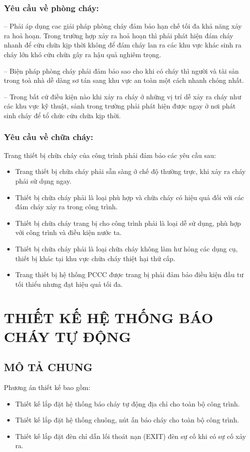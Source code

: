\subsubsection{Yêu cầu về phòng cháy:}
-- Phải áp dụng cac giải pháp phòng cháy đảm bảo hạn chế tối đa khả năng xảy ra hoả hoạn. Trong trường hợp xảy ra hoả hoạn thì phải phát hiện đám cháy nhanh để cứu chữa kịp thời không để đám cháy lan ra các khu vực khác sinh ra cháy lớn khó cứu chữa gây ra hậu quả nghiêm trọng.

-- Biện pháp phòng cháy phải đảm bảo sao cho khi có cháy thì người và tài sản trong toà nhà dễ dàng sơ tán sang khu vực an toàn một cách nhanh chóng nhất.

-- Trong bất cứ điều kiện nào khi xảy ra cháy ở những vị trí dễ xảy ra cháy như các khu vực kỹ thuật, sảnh trong trường phải phát hiện được ngay ở nơi phát sinh cháy để tổ chức cứu chữa kịp thời.
\subsubsection{Yêu cầu về chữa cháy:}
Trang thiết bị chữa cháy của công trình phải đảm bảo các yêu cầu sau:
\begin{itemize}
	\item Trang thiết bị chữa cháy phải sẵn sàng ở chế độ thường trực, khi xảy ra cháy phải sử dụng ngay.
	\item Thiết bị chữa cháy phải là loại phù hợp và chữa cháy có hiệu quả đối với các đám cháy xảy ra trong công trình.
	\item Thiết bị chữa cháy trang bị cho công trình phải là loại dễ sử dụng, phù hợp với công trình và điều kiện nước ta.
	\item Thiết bị chữa cháy phải là loại chữa cháy không làm hư hỏng các dụng cụ, thiết bị khác tại khu vực chữa cháy thiệt hại thứ cấp.
	\item Trang thiết bị hệ thống PCCC được trang bị phải đảm bảo điều kiện đầu tư tối thiểu nhưng đạt hiệu quả tối đa.
\end{itemize}

\section{THIẾT KẾ HỆ THỐNG BÁO CHÁY TỰ ĐỘNG}
\subsection{MÔ TẢ CHUNG}
Phương án thiết kế bao gồm:
\begin{itemize}[label={-}]
	\item Thiết kế lắp đặt hệ thống báo cháy tự động địa chỉ cho toàn bộ công trình.
	\item Thiết kế lắp đặt hệ thống chuông, nút ấn báo cháy cho toàn bộ công trình.
	\item Thiết kế lắp đặt đèn chỉ dẫn lối thoát nạn (EXIT) đèn sự cố khi có sự cố xảy ra.
\end{itemize}

